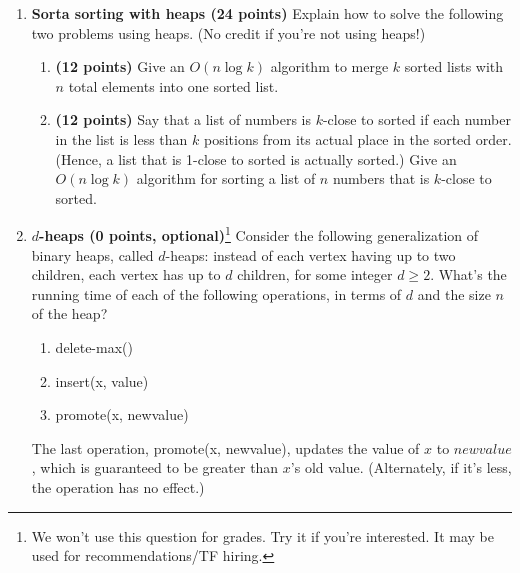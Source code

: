 \documentclass[11pt]{article}
\begin{document}
\begin{enumerate}


\item {\bf Sorta sorting with heaps (24 points)} Explain how to solve the following two problems using heaps.
(No credit if you're not using heaps!)  
\begin{enumerate}
    \item {\bf (12 points)}
    Give an $O(n \log k)$
algorithm to merge $k$ sorted lists with $n$ total elements into one
sorted list.
    \item {\bf (12 points)}
Say that a list of numbers is $k$-close to
sorted if each number in the list is less than $k$ positions from its
actual place in the sorted order.  (Hence, a list that is 1-close to
sorted is actually sorted.)  Give an $O(n \log k)$ algorithm for
sorting a list of $n$ numbers that is $k$-close to sorted.
\end{enumerate}

\item 
{\bf $d$-heaps (0 points, optional)}\footnote{We won't use this question for grades. Try it if you're interested. 
It may be used for recommendations/TF hiring.}
Consider the following generalization of binary heaps, called $d$-heaps: instead of each vertex having up to two children, each vertex has up to $d$ children, for some integer $d \ge 2$. What's the running time of each of the following operations, in terms of $d$ and the size $n$ of the heap?
\begin{enumerate}
\item delete-max()
\item insert(x, value)
\item promote(x, newvalue)
\end{enumerate}
The last operation, promote(x, newvalue), updates the value of $x$ to $newvalue$, which is guaranteed to be greater than $x$'s old value. (Alternately, if it's less, the operation has no effect.)


\end{enumerate}
\end{document}
